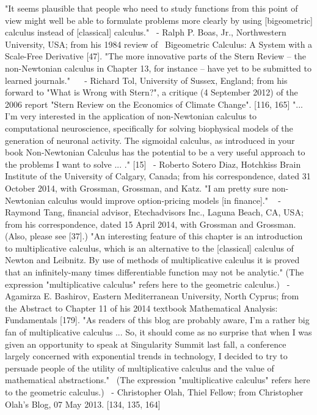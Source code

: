 \documentclass[12pt]{article}
\begin{document}
"It seems plausible that people who need to study functions from this point of view might well be able to formulate problems more clearly by using [bigeometric] calculus instead of [classical] calculus."  - Ralph P. Boas, Jr., Northwestern University, USA; from his 1984 review of  Bigeometric Calculus: A System with a Scale-Free Derivative [47].
"The more innovative parts of the Stern Review – the non-Newtonian calculus in Chapter 13, for instance – have yet to be submitted to learned journals."    - Richard Tol, University of Sussex, England; from his forward to "What is Wrong with Stern?", a critique (4 September 2012) of the 2006 report "Stern Review on the Economics of Climate Change". [116, 165]
"... I’m very interested in the application of non-Newtonian calculus to computational neuroscience, specifically for solving biophysical models of the generation of neuronal activity. The sigmoidal calculus, as introduced in your book Non-Newtonian Calculus has the potential to be a very useful approach to the problems I want to solve ... ." [15]  - Roberto Sotero Diaz, Hotchkiss Brain Institute of the University of Calgary, Canada; from his correspondence, dated 31 October 2014, with Grossman, Grossman, and Katz. 
"I am pretty sure non-Newtonian calculus would improve option-pricing models [in finance]."   - Raymond Tang, financial advisor, Etechadvisors Inc., Laguna Beach, CA, USA; from his correspondence, dated 15 April 2014, with Grossman and Grossman. (Also, please see [37].)
"An interesting feature of this chapter is an introduction to multiplicative calculus, which is an alternative to the [classical] calculus of Newton and Leibnitz. By use of methods of multiplicative calculus it is proved that an infinitely-many times differentiable function may not be analytic." (The expression "multiplicative calculus" refers here to the geometric calculus.)  - Agamirza E. Bashirov, Eastern Mediterranean University, North Cyprus; from the Abstract to Chapter 11 of his 2014 textbook Mathematical Analysis: Fundamentals [179].
"As readers of this blog are probably aware, I’m a rather big fan of multiplicative calculus ... So, it should come as no surprise that when I was given an opportunity to speak at Singularity Summit last fall, a conference largely concerned with exponential trends in technology, I decided to try to persuade people of the utility of multiplicative calculus and the value of mathematical abstractions."  (The expression "multiplicative calculus" refers here to the geometric calculus.)  - Christopher Olah, Thiel Fellow; from Christopher Olah's Blog, 07 May 2013. [134, 135, 164]
\end{document}
